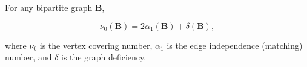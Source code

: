 For any bipartite graph $\mathbf{B}$,

$$\nu_0(\mathbf{B}) = 2\alpha_1(\mathbf{B}) + \delta(\mathbf{B}),$$

where $\nu_0$ is the vertex covering number, $\alpha_1$ is the edge independence (matching) number, and $\delta$ is the graph deficiency.
